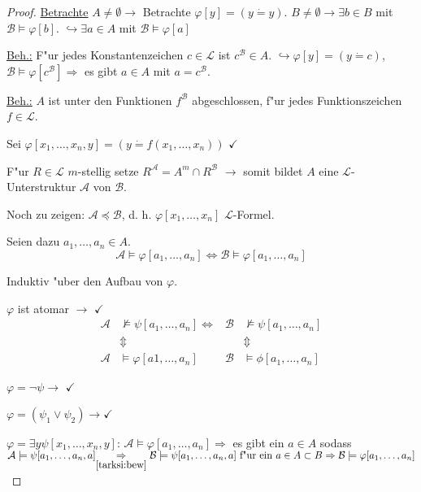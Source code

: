 \documentclass[a4paper,12pt,numbers=noenddot,parskip=full]{scrartcl}
\newcommand{\scrL}{\mathcal{L}}
\newcommand{\scrA}{\mathcal{A}}
\newcommand{\scrB}{\mathcal{B}}
\theoremstyle{dotless}
\begin{document}
\begin{proof}
	\underline{Betrachte} $A \neq \emptyset \rightarrow$ Betrachte $\varphi[y] = (y \dot= y)$. $B \neq \emptyset \rightarrow \exists b \in B$ mit $\scrB \models \varphi[b]$. $\hookrightarrow \exists a \in A$ mit $\scrB \models \varphi[a]$
	
	\underline{Beh.:} F"ur jedes Konstantenzeichen $c \in \scrL$ ist $c^\scrB \in A$. $\hookrightarrow \varphi[y] = (y \dot= c)$, $\scrB \models \varphi[c^\scrB] \Rightarrow$ es gibt $a \in A$ mit $a=c^\scrB$.
	
	\underline{Beh.:} $A$ ist unter den Funktionen $f^\scrB$ abgeschlossen, f"ur jedes Funktionszeichen $f \in \scrL$.
	
	Sei $\varphi[x_1, \dots, x_n, y] = (y \dot= f(x_1, \dots, x_n))$ $\checkmark$
	
	F"ur $R \in \scrL$ $m$-stellig setze $R^\scrA = A^m \cap R^\scrB$ $\longrightarrow$ somit bildet $A$ eine $\scrL$-Unterstruktur $\scrA$ von $\scrB$.
	
	Noch zu zeigen: $\scrA \preceq \scrB$, d. h. $\varphi[x_1, \dots, x_n]$ $\scrL$-Formel.
	
	Seien dazu $a_1, \dots, a_n \in A$.
	\begin{equation}\label{tarksi:bew}
		\scrA \models \varphi[a_1, \dots, a_n] \Leftrightarrow \scrB \models \varphi[a_1, \dots,a_n]
	\end{equation}
	
	Induktiv "uber den Aufbau von $\varphi$.
	
	$\varphi$ ist atomar $\longrightarrow$ $\checkmark$
	\begin{align*}
		\scrA &\not\models \psi[a_1, \dots, a_n] \Leftrightarrow &\scrB &\not\models \psi[a_1, \dots, a_n]\\
		&\Updownarrow &&\Updownarrow\\
		\scrA &\models \varphi[a1, \dots, a_n] &\scrB &\models \phi[a_1, \dots, a_n]
	\end{align*}
	
	$\varphi= \lnot \psi \longrightarrow$ $\checkmark$
	
	$\varphi = (\psi_1 \lor \psi_2) \longrightarrow \checkmark$
	
	$\varphi = \exists y \psi[x_1, \dots, x_n, y]$: $\scrA \models \varphi[a_1, \dots, a_n] \Rightarrow$ es gibt ein $a \in A$ sodass $\scrA \models \psi[a_1, \dots, a_n, a]\\ {\underset{\ref{tarksi:bew}}{\Rightarrow} \scrB \models \psi[a_1, \dots, a_n, a]} \text{ f"ur ein } a \in A \subset B \Rightarrow \scrB \models \varphi[a_1, \dots, a_n]$
	

\end{proof}
\end{document}
